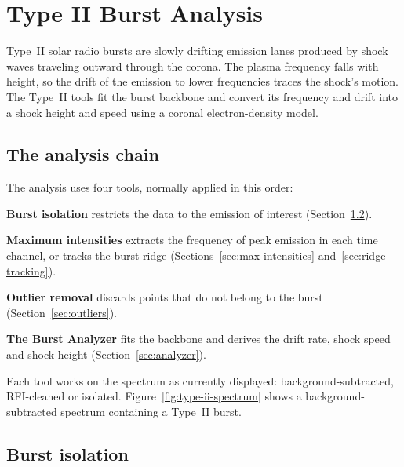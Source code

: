 \chapter{Type II Burst Analysis}
\label{ch:type-ii}

Type~II solar radio bursts are slowly drifting emission lanes produced by shock waves
traveling outward through the corona. The plasma frequency falls with height, so the
drift of the emission to lower frequencies traces the shock's motion. The Type~II tools
fit the burst backbone and convert its frequency and drift into a shock height and speed
using a coronal electron-density model.

\section{The analysis chain}

The analysis uses four tools, normally applied in this order:
\begin{steps}
  \item \textbf{Burst isolation} restricts the data to the emission of interest
    (Section~\ref{sec:isolation}).
  \item \textbf{Maximum intensities} extracts the frequency of peak emission in each time
    channel, or tracks the burst ridge (Sections~\ref{sec:max-intensities}
    and~\ref{sec:ridge-tracking}).
  \item \textbf{Outlier removal} discards points that do not belong to the burst
    (Section~\ref{sec:outliers}).
  \item \textbf{The Burst Analyzer} fits the backbone and derives the drift rate, shock
    speed and shock height (Section~\ref{sec:analyzer}).
\end{steps}
Each tool works on the spectrum as currently displayed: background-subtracted,
RFI-cleaned or isolated. Figure~\ref{fig:type-ii-spectrum} shows a background-subtracted
spectrum containing a Type~II burst.


\section{Burst isolation}
\label{sec:isolation}


